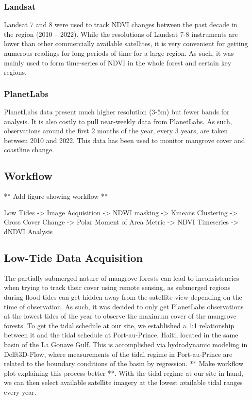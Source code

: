 \documentclass[journal,article,submit,pdftex,moreauthors]{Definitions/mdpi}
\begin{document}
\subsubsection{Landsat}
Landsat 7 and 8 were used to track NDVI changes between the past decade in the region (2010 – 2022). While the resolutions of Landsat 7-8 instruments are lower than other commercially available satellites, it is very convenient for getting numerous readings for long periods of time for a large region. As such, it was mainly used to form time-series of NDVI in the whole forest and certain key regions.

\subsubsection{PlanetLabs}
PlanetLabs data present much higher resolution (3-5m) but fewer bands for analysis. It is also costly to pull near-weekly data from PlanetLabs. As such, observations around the first 2 months of the year, every 3 years, are taken between 2010 and 2022. This data has been used to monitor mangrove cover and coastline change.

\subsection{Workflow}
** Add figure showing workflow **

Low Tides -> Image Acquisition -> NDWI masking -> Kmeans Clustering -> Gross Cover Change -> Polar Moment of Area Metric -> NDVI Timeseries -> dNDVI Analysis

\subsection{Low-Tide Data Acquisition}
The partially submerged nature of mangrove forests can lead to inconsistencies when trying to track their cover using remote sensing, as submerged regions during flood tides can get hidden away from the satellite view depending on the time of observation. As such, it was decided to only get PlanetLabs observations at the lowest tides of the year to observe the maximum cover of the mangrove forests.
To get the tidal schedule at our site, we established a 1:1 relationship between it and the tidal schedule at Port-au-Prince, Haiti, located in the same basin of the La Gonave Gulf. This is accomplished via hydrodynamic modeling in Delft3D-Flow, where measurements of the tidal regime in Port-au-Prince are related to the boundary conditions of the basin by regression. ** Make workflow plot explaining this process better **. 
With the tidal regime at our site in hand, we can then select available satellite imagery at the lowest available tidal ranges every year. 
\end{document}
